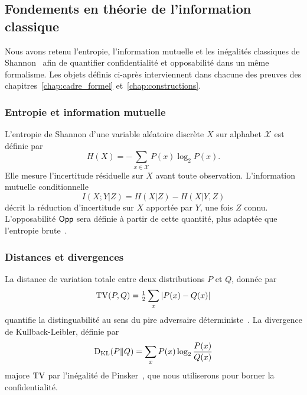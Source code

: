 \subsection{Fondements en th\'eorie de l'information classique}
\label{subsec:fondements_info}
\begin{sloppypar}
Nous avons retenu l'entropie, l'information
mutuelle et les in\'egalit\'es classiques de Shannon~\cite{Shannon48,Shannon49} afin
de quantifier confidentialit\'e et opposabilit\'e dans un m\^eme formalisme.
Les objets d\'efinis ci-apr\`es interviennent dans chacune des preuves des chapitres~\ref{chap:cadre_formel} et~\ref{chap:constructions}.

\subsubsection{Entropie et information mutuelle}
\label{subsubsec:entropie_info_mutuelle}

L'entropie de Shannon d'une variable al\'eatoire discr\`ete $X$ sur alphabet
$\mathcal{X}$ est d\'efinie par~\cite{Shannon48,CoverThomas06,Fano61}
\begin{equation}
H(X) = -\sum_{x \in \mathcal{X}} P(x)\log_2 P(x).
\label{eq:entropie_shannon}
\end{equation}
Elle mesure l'incertitude r\'esiduelle sur $X$ avant toute observation.
L'information mutuelle conditionnelle
\begin{equation}
I(X;Y|Z) = H(X|Z) - H(X|Y,Z)
\label{eq:mi_conditionnelle}
\end{equation}
d\'ecrit la r\'eduction d'incertitude sur $X$ apport\'ee par $Y$, une fois $Z$
connu. L'opposabilit\'e $\mathsf{Opp}$ sera d\'efinie \`a partir de cette quantit\'e, plus adapt\'ee que l'entropie brute~\cite{Wyner75,WynerZiv76}.

\subsubsection{Distances et divergences}
\label{subsubsec:distances_divergences}

La distance de variation totale entre deux distributions $P$ et $Q$, donn\'ee par
\begin{equation}
\operatorname{TV}(P,Q) = \tfrac{1}{2}\sum_x |P(x) - Q(x)|
\label{eq:tv_distance}
\end{equation}
quantifie la distinguabilit\'e au sens du pire adversaire d\'eterministe~\cite{CoverThomas06}. La
divergence de Kullback-Leibler, d\'efinie par
\begin{equation}
\operatorname{D_{\text{KL}}}(P \| Q) = \sum_x P(x)\log_2\frac{P(x)}{Q(x)}
\label{eq:kl_divergence}
\end{equation}
majore $\operatorname{TV}$ par l'in\'egalit\'e de Pinsker~\cite{Pinsker1964}, que nous utiliserons pour borner
la confidentialit\'e.


\end{sloppypar}
